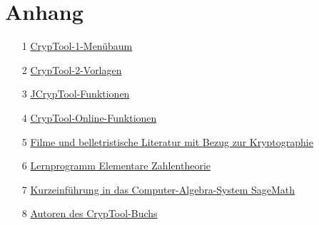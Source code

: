 \begin{appendix}
\newpage
\hypertarget{appendix-start}{}\label{s:appendix-start}
\chapter{Anhang}
    \begin{itemize}%
      \item[1] \hyperlink{appendix-menu-overview-CT1}{CrypTool-1-Menübaum}
      \item[2] \hyperlink{appendix-template-overview-CT2}{CrypTool-2-Vorlagen}
      \item[3] \hyperlink{appendix-function-overview-JCT}{JCrypTool-Funktionen}
      \item[4] \hyperlink{appendix-function-overview-CTO}{CrypTool-Online-Funktionen}
      \item[5] \hyperlink{appendix-movies}{Filme und belletristische
                          Literatur mit Bezug zur Kryptographie}
      \item[6] \hyperlink{appendix-Learn-NT}
                         {Lernprogramm Elementare Zahlentheorie}
      \item[7] \hyperlink{appendix-using-sage}
                         {Kurzeinführung in das Computer-Algebra-System SageMath}
      \item[8] \hyperlink{appendix-authors}{Autoren des CrypTool-Buchs}
    \end{itemize}
\renewcommand{\CTBChapName}{(Appendix\_Menus)}

\renewcommand{\CTBChapName}{(Appendix\_LearnTool)}

\renewcommand{\CTBChapName}{(Appendix\_Sage)}

\renewcommand{\CTBChapName}{(Appendix\_Authors)}

\end{appendix}

\renewcommand{\CTBChapName}{(Appendix gnu-fdl)}


\begingroup  %
  \setlength{\parskip}{0pt}  %


